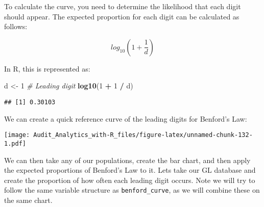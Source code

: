 \documentclass[
]{book}
\newenvironment{Shaded}{\begin{snugshade}}{\end{snugshade}}
\newcommand{\CommentTok}[1]{\textcolor[rgb]{0.56,0.35,0.01}{\textit{#1}}}
\newcommand{\DataTypeTok}[1]{\textcolor[rgb]{0.13,0.29,0.53}{#1}}
\newcommand{\DecValTok}[1]{\textcolor[rgb]{0.00,0.00,0.81}{#1}}
\newcommand{\KeywordTok}[1]{\textcolor[rgb]{0.13,0.29,0.53}{\textbf{#1}}}
\newcommand{\NormalTok}[1]{#1}
\newcommand{\OperatorTok}[1]{\textcolor[rgb]{0.81,0.36,0.00}{\textbf{#1}}}
\newcommand{\StringTok}[1]{\textcolor[rgb]{0.31,0.60,0.02}{#1}}
\begin{document}
To calculate the curve, you need to determine the likelihood that each digit should appear. The expected proportion for each digit can be calculated as follows:

\[log_{10}\left( 1 + \frac{1}{d}\right)\]

In R, this is represented as:

\begin{Shaded}
\begin{Highlighting}[]
\NormalTok{d <-}\StringTok{ }\DecValTok{1} \CommentTok{# Leading digit}
\KeywordTok{log10}\NormalTok{(}\DecValTok{1} \OperatorTok{+}\StringTok{ }\DecValTok{1} \OperatorTok{/}\StringTok{ }\NormalTok{d)}
\end{Highlighting}
\end{Shaded}

\begin{verbatim}
## [1] 0.30103
\end{verbatim}

We can create a quick reference curve of the leading digits for Benford's Law:

\begin{Shaded}
\end{Shaded}

\texttt{[image: Audit\_Analytics\_with-R\_files/figure-latex/unnamed-chunk-132-1.pdf]}

We can then take any of our populations, create the bar chart, and then apply the expected proportions of Benford's Law to it. Lets take our GL database and create the proportion of how often each leading digit occurs. Note we will try to follow the same variable structure as \texttt{benford\_curve}, as we will combine these on the same chart.
\end{document}
